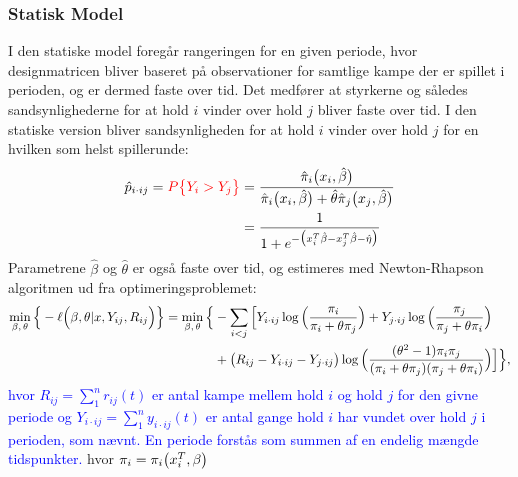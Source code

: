 \documentclass[11pt,a4paper]{article}
\begin{document}
\subsubsection{Statisk Model}
I den statiske model foregår rangeringen for en given periode, hvor designmatricen bliver baseret på observationer for samtlige kampe der er spillet i perioden, og er dermed faste over tid. Det medfører at styrkerne og således sandsynlighederne for at hold $i$ vinder over hold $j$ bliver faste over tid. I den statiske version bliver sandsynligheden for at hold $i$ vinder over hold $j$ for en hvilken som helst spillerunde:
\begin{align}
    \hat{p}_{i\cdot ij}=\textcolor{red}{{P\big{\{}Y_i>Y_j\big{\}}}}
    &=\frac{\hat{\pi}_i\big{(}x_i,\hat{\beta}\big{)}}{\hat{\pi}_i\big{(}x_i,\hat{\beta}\big{)}+\hat{\theta}\hat{\pi}_j\big{(}x_j,\hat{\beta}\big{)}}\\
    &=\frac{1}{1+e^{-\big{(}x_i^T\hat{\beta}-x_j^T\hat{\beta}-\hat{\eta}\big{)}}}
\end{align}
Parametrene $\hat{\beta}$ og $\hat{\theta}$ er også faste over tid, og estimeres med Newton-Rhapson algoritmen ud fra optimeringsproblemet:
\begin{align*}
\min_{\beta,\,\theta} \Big{\{}-\ell\Big{(}\beta,\theta|x,Y_{ij},R_{ij}\Big{)}\Big{\}}=
\min_{\beta,\,\theta} \Big{\{}&- \sum_{i<j}\Big{[}Y_{i\cdot ij}\log\Big{(}\frac{\pi_i}{\pi_i+\theta\pi_j}\Big{)}
+ Y_{j\cdot ij}\log\Big{(}\frac{\pi_j}{\pi_j+\theta\pi_i}\Big{)}\\
&+ \big{(}R_{ij}-Y_{i\cdot ij}-Y_{j\cdot ij}\big{)} \log\Big{(}\frac{(\theta^2-1)\pi_i \pi_j}{(\pi_i+\theta\pi_j)(\pi_j+\theta\pi_i)}\Big{)}\Big{]}\Big{\}},\\
\end{align*}
\textcolor{blue}{hvor $R_{ij}=\sum_1^n r_{ij}(t)$ er antal kampe mellem hold $i$ og hold $j$ for den givne periode og $Y_{i\cdot ij}=\sum_1^n y_{i \cdot ij}(t)$ er antal gange hold $i$ har vundet over hold $j$ i perioden, som nævnt. En periode forstås som summen af en endelig mængde tidspunkter. } hvor $\pi_i=\pi_i\big{(}x_i^T,\beta\big{)}$
\end{document}
